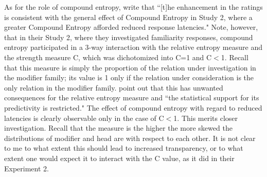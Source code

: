 As for the role of compound entropy, \citet[467]{PhamandBaayen:2013}
write that ``[t]he enhancement in the ratings
is consistent with the general effect of Compound Entropy in Study 2, where a
greater Compound Entropy afforded reduced response latencies." Note,
however, that in their Study 2, where they investigated familiarity
responses, compound entropy participated in a 3-way interaction
with the relative entropy measure and the strength measure C, which
was dichotomized into C=1 and C$<$1. Recall that this measure is
simply the proportion of the relation under investigation in the
modifier family; its value is 1 only if the relation under
consideration is the only relation in the modifier
family. \citet[464]{PhamandBaayen:2013} point out that %
this has unwanted consequences for the relative entropy measure and
``the statistical support for its predictivity is restricted." The
effect of compound entropy with regard to reduced latencies is clearly
observable only in the case of C$<$1. This merits closer
investigation.
Recall that the measure is the higher the more
skewed the distributions of modifier and head are with respect to each
other. It is not clear to me to what extent this should lead to increased
transparency, or to what extent one would expect it to interact with the C
value, as it did in their Experiment 2.




